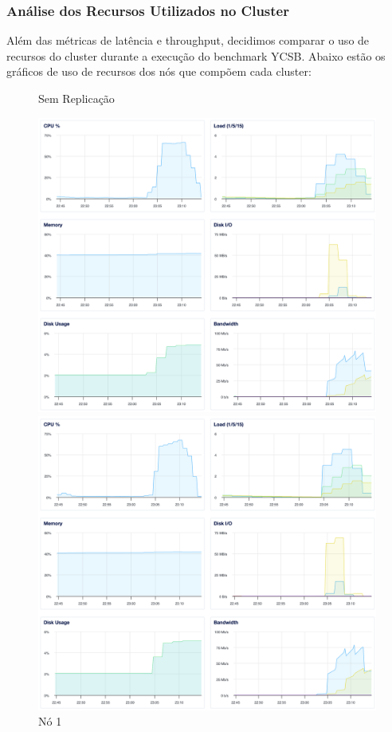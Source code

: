 \subsubsection{Análise dos Recursos Utilizados no Cluster}
Além das métricas de latência e throughput, decidimos comparar o uso de recursos do cluster durante a execução do benchmark YCSB.
Abaixo estão os gráficos de uso de recursos dos nós que compõem cada cluster:
\begin{figure}[H]
	\captionsetup{labelformat=empty}
  	\caption{Sem Replicação}
	\centering
  \begin{minipage}{0.32\linewidth}
    \centering
    \includegraphics[width=\linewidth]{imgs/3-1-01.png}
    \caption{Nó 1}
  \end{minipage}
  \hfill
  \begin{minipage}{0.32\linewidth}
    \centering
    \includegraphics[width=\linewidth]{imgs/3-1-02.png}

\end{minipage}
\end{figure}
